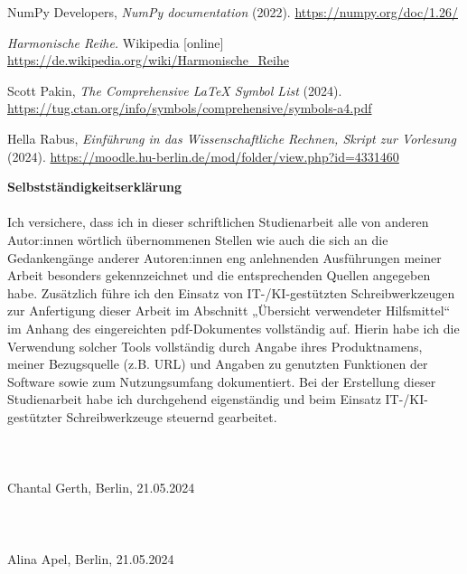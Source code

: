 \documentclass{scrreprt}
\begin{document}
\begin{thebibliography}{99}

 NumPy Developers, \emph{NumPy documentation} (2022). \url{https://numpy.org/doc/1.26/}

 \emph{Harmonische Reihe.} Wikipedia [online] \url{https://de.wikipedia.org/wiki/Harmonische_Reihe}

 Scott Pakin, \emph{The Comprehensive \LaTeX{} Symbol List} (2024). \url{https://tug.ctan.org/info/symbols/comprehensive/symbols-a4.pdf}

 Hella Rabus, \emph{Einführung in das Wissenschaftliche Rechnen, Skript zur Vorlesung} (2024). \url{https://moodle.hu-berlin.de/mod/folder/view.php?id=4331460}

\end{thebibliography}

\newpage

\noindent \textbf{Selbstständigkeitserklärung}
\\ \\
Ich versichere, dass ich in dieser schriftlichen Studienarbeit alle von anderen Autor:innen wörtlich übernommenen Stellen wie auch die sich an die Gedankengänge anderer Autoren:innen eng anlehnenden Ausführungen meiner Arbeit besonders gekennzeichnet und die entsprechenden Quellen angegeben habe. Zusätzlich führe ich den Einsatz von IT-/KI-gestützten Schreibwerkzeugen zur Anfertigung dieser Arbeit im Abschnitt „Übersicht verwendeter Hilfsmittel“ im Anhang des eingereichten pdf-Dokumentes vollständig auf. Hierin habe ich die Verwendung solcher Tools vollständig durch Angabe ihres Produktnamens, meiner Bezugsquelle (z.B. URL) und Angaben zu genutzten Funktionen der Software sowie zum Nutzungsumfang dokumentiert. Bei der Erstellung dieser Studienarbeit habe ich durchgehend eigenständig und beim Einsatz IT-/KI-gestützter Schreibwerkzeuge steuernd gearbeitet. \\ \\ \\ \\


\noindent Chantal Gerth, Berlin, 21.05.2024 \\ \\ \\ \\

\noindent Alina Apel, Berlin, 21.05.2024 \\

\end{document}
